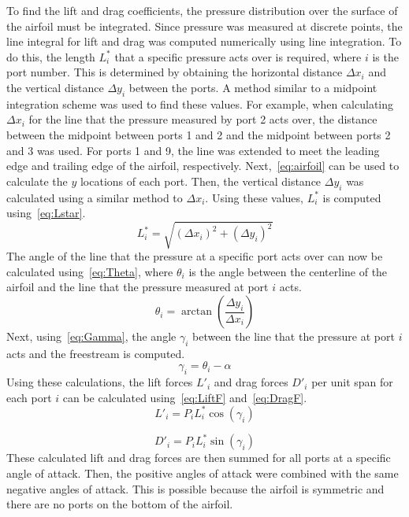 \documentclass[journal,letterpaper]{IEEEtran}
\begin{document}
To find the lift and drag coefficients, the pressure distribution over the surface of the airfoil must be integrated.
Since pressure was measured at discrete points, the line integral for lift and drag was computed numerically using line integration.
To do this, the length $L_i^*$ that a specific pressure acts over is required, where $i$ is the port number.
This is determined by obtaining the horizontal distance $\Delta x_i$ and the vertical distance $\Delta y_i$ between the ports.
A method similar to a midpoint integration scheme was used to find these values.
For example, when calculating $\Delta x_i$ for the line that the pressure measured by port 2 acts over, the distance between the midpoint between ports 1 and 2 and the midpoint between ports 2 and 3 was used.
For ports 1 and 9, the line was extended to meet the leading edge and trailing edge of the airfoil, respectively.
Next,~\eqref{eq:airfoil} can be used to calculate the $y$ locations of each port. Then, the vertical distance $\Delta y_i$ was calculated using a similar method to $\Delta x_i$. Using these values, $L_i^*$ is computed using~\eqref{eq:Lstar}.
\begin{equation} \label{eq:Lstar}
    L_i^* = \sqrt{\left(\Delta x_i\right)^2 + \left(\Delta y_i\right)^2}
\end{equation}
The angle of the line that the pressure at a specific port acts over can now be calculated using~\eqref{eq:Theta}, where $\theta_i$ is the angle between the centerline of the airfoil and the line that the pressure measured at port $i$ acts.
\begin{equation} \label{eq:Theta}
    \theta_i = \arctan\left(\frac{\Delta y_i}{\Delta x_i}\right)
\end{equation}
Next, using~\eqref{eq:Gamma}, the angle $\gamma_i$ between the line that the pressure at port $i$ acts and the freestream is computed.
\begin{equation} \label{eq:Gamma}
    \gamma_i = \theta_i - \alpha
\end{equation}
Using these calculations, the lift forces $L'_i$ and drag forces $D'_i$  per unit span for each port $i$ can be calculated using~\eqref{eq:LiftF} and~\eqref{eq:DragF}.
\begin{equation} \label{eq:LiftF}
    L'_i = P_i L_i^* \cos\left(\gamma_i\right)
\end{equation}

\begin{equation} \label{eq:DragF}
    D'_i = P_i L_i^* \sin\left(\gamma_i\right)
\end{equation}
These calculated lift and drag forces are then summed for all ports at a specific angle of attack.
Then, the positive angles of attack were combined with the same negative angles of attack.
This is possible because the airfoil is symmetric and there are no ports on the bottom of the airfoil.
\end{document}
